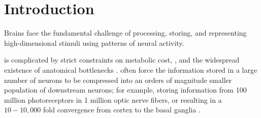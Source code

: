 %

\section*{Introduction}
\label{sec:introduction}
Brains face the fundamental challenge of 
processing, storing, and representing high-dimensional stimuli
using patterns of neural activity.

 is complicated
by strict constraints on metabolic cost,
,
and the widespread existence of anatomical bottlenecks 
\cite{Kempermann2002,BarGad2003_Review,Babinsky1993}.
 often force the information
stored in a large number of neurons
to be compressed into an orders of magnitude smaller population
of downstream neurons;
for example, storing information from 100 million photoreceptors 
in 1 million optic nerve fibers,
or resulting in a $10 - 10,000$ fold convergence from cortex to the basal ganglia
\cite{GanguliSompolinsky2012}.

